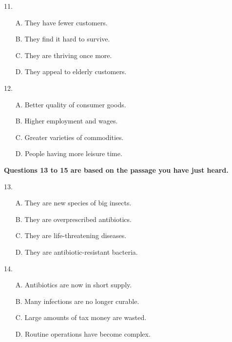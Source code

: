 \documentclass[UTF8,11pt]{ctexart}
\begin{document}
11.


\begin{itemize}[leftmargin=2em,itemsep=.2em,topsep=.4em]\item[A.] They have fewer customers.
\item[B.] They find it hard to survive.
\item[C.] They are thriving once more.
\item[D.] They appeal to elderly customers.
\end{itemize}

12.


\begin{itemize}[leftmargin=2em,itemsep=.2em,topsep=.4em]\item[A.] Better quality of consumer goods.
\item[B.] Higher employment and wages.
\end{itemize}

\begin{itemize}[leftmargin=2em,itemsep=.2em,topsep=.4em]\item[C.] Greater varieties of commodities.
\item[D.] People having more leisure time.
\end{itemize}

\textbf{Questions 13 to 15 are based on the passage you have just heard.}


13.


\begin{itemize}[leftmargin=2em,itemsep=.2em,topsep=.4em]\item[A.] They are new species of big insects.
\item[B.] They are overprescribed antibiotics.
\item[C.] They are life-threatening diseases.
\item[D.] They are antibiotic-resistant bacteria.
\end{itemize}

14.


\begin{itemize}[leftmargin=2em,itemsep=.2em,topsep=.4em]\item[A.] Antibiotics are now in short supply.
\item[B.] Many infections are no longer curable.
\item[C.] Large amounts of tax money are wasted.
\item[D.] Routine operations have become complex.
\end{itemize}
\end{document}
